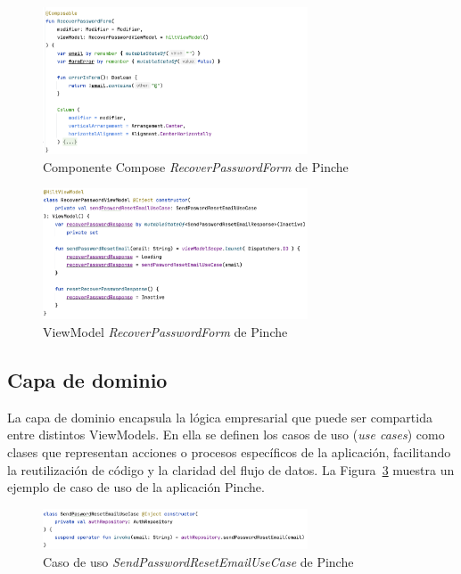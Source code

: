 \begin{figure}[H]
\centering
\includegraphics[width=0.7\textwidth]{./img/description/recoverPasswordView.png}
\caption{Componente Compose \textit{RecoverPasswordForm} de Pinche}
\label{fig:recoverPasswordView}
\end{figure}

\begin{figure}[H]
\centering
\includegraphics[width=0.7\textwidth]{./img/description/recoverPasswordViewModel.png}
\caption{ViewModel \textit{RecoverPasswordForm} de Pinche}
\label{fig:recoverPasswordViewModel}
\end{figure}

\subsection{Capa de dominio}

La capa de dominio encapsula la lógica empresarial que puede ser compartida entre distintos ViewModels. En ella se definen los casos de uso (\textit{use cases}) como clases que representan acciones o procesos específicos de la aplicación, facilitando la reutilización de código y la claridad del flujo de datos. La Figura~\ref{fig:recoverUseCase} muestra un ejemplo de caso de uso de la aplicación Pinche.

\begin{figure}[H]
\centering
\includegraphics[width=0.7\textwidth]{./img/description/recoverUseCase.png}
\caption{Caso de uso \textit{SendPasswordResetEmailUseCase} de Pinche}
\label{fig:recoverUseCase}
\end{figure}

